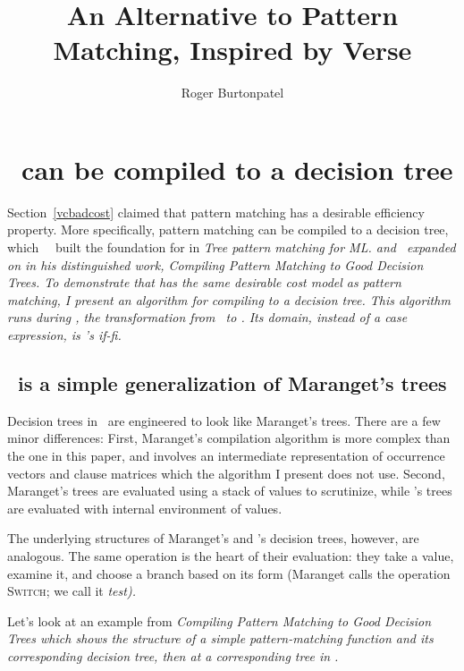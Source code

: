 \documentclass[manuscript,screen,review, 12pt, nonacm]{acmart}
\title{An Alternative to Pattern Matching, Inspired by Verse}
\author{Roger Burtonpatel}
\affiliation{%
\institution{Tufts University}
\streetaddress{419 Boston Ave}
  \city{Medford}
  \state{Massachusetts}
  \country{USA}
  \postcode{02155}
  }
\begin{document}
  

\section{\VMinus\ can be compiled to a decision tree}
\label{vminustod}
    Section~\ref{vcbadcost} claimed that pattern matching has a desirable
    efficiency property. More specifically, pattern matching can be compiled to
    a decision tree, which~~\citet{macqueen1985tree} built the foundation for in
    \it{Tree pattern matching for ML.} and~\citet{maranget} expanded on in his
    distinguished work, \it{Compiling Pattern Matching to Good Decision Trees}.
    To demonstrate that \VMinus has the same desirable cost model as pattern
    matching, I present an algorithm for compiling \VMinus to a decision tree.
    This algorithm runs during \DTran, the transformation from \VMinus\ to \D.
    Its domain, instead of a \it{case} expression, is \VMinus's \it{if-fi}. 
       
    \subsection{\D\ is a simple generalization of Maranget's trees} 


    Decision trees in \D\ are engineered to look like Maranget's trees. There
    are a few minor differences: First, Maranget's compilation algorithm is more
    complex than the one in this paper, and involves an intermediate
    representation of occurrence vectors and clause matrices which the algorithm
    I present does not use. Second, Maranget's trees are evaluated using a stack
    of values to scrutinize, while \D's trees are evaluated with internal
    environment of values. 

    The underlying structures of Maranget's and \D's decision trees, however,
    are analogous. The same operation is the heart of their evaluation: they
    take a value, examine it, and choose a branch based on its form (Maranget
    calls the operation \textsc{Switch}; we call it \it{test}). 

    Let's look at an example from \it{Compiling Pattern Matching to Good
    Decision Trees} which shows the structure of a simple pattern-matching
    function and its corresponding decision tree, then at a corresponding tree
    in \D. 
\end{document}
